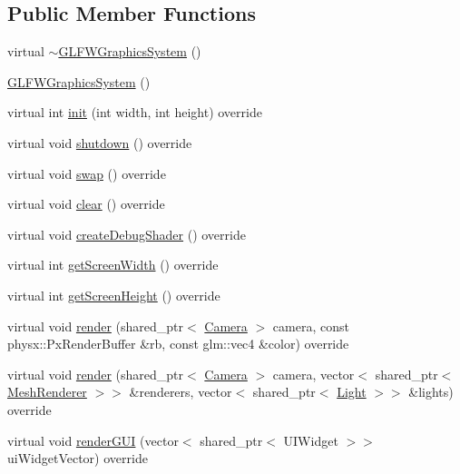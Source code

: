 \subsection*{Public Member Functions}
\begin{DoxyCompactItemize}
\item 
virtual \hyperlink{class_g_l_f_w_graphics_system_ad73c55b92fcbd41921d7929f7332e8af}{$\sim$\+G\+L\+F\+W\+Graphics\+System} ()
\item 
\hyperlink{class_g_l_f_w_graphics_system_a0cc238f56cef77f89e5b09b5a9b46cb6}{G\+L\+F\+W\+Graphics\+System} ()
\item 
virtual int \hyperlink{class_g_l_f_w_graphics_system_a4cba85b32cd751aab2f5a84c01199953}{init} (int width, int height) override
\item 
virtual void \hyperlink{class_g_l_f_w_graphics_system_ab12358c2a7034dcf75df074fbe4d86d4}{shutdown} () override
\item 
virtual void \hyperlink{class_g_l_f_w_graphics_system_a52ef8cd44b2b45828452626d9e0b54d6}{swap} () override
\item 
virtual void \hyperlink{class_g_l_f_w_graphics_system_a84767a0209a04f598b866048e04b2035}{clear} () override
\item 
virtual void \hyperlink{class_g_l_f_w_graphics_system_a446723c2cad999498d013f71ab8e570f}{create\+Debug\+Shader} () override
\item 
virtual int \hyperlink{class_g_l_f_w_graphics_system_a8c31a0ea165e6c9cbd0e0c656342a200}{get\+Screen\+Width} () override
\item 
virtual int \hyperlink{class_g_l_f_w_graphics_system_ab6b0c31d3d5fb238a19c645630b87543}{get\+Screen\+Height} () override
\item 
virtual void \hyperlink{class_g_l_f_w_graphics_system_a606c4e6e8e53084d3d23bc7bbcdfc228}{render} (shared\+\_\+ptr$<$ \hyperlink{class_camera}{Camera} $>$ camera, const physx\+::\+Px\+Render\+Buffer \&rb, const glm\+::vec4 \&color) override
\item 
virtual void \hyperlink{class_g_l_f_w_graphics_system_a2cde625e8606c2905d7728f2cadf7371}{render} (shared\+\_\+ptr$<$ \hyperlink{class_camera}{Camera} $>$ camera, vector$<$ shared\+\_\+ptr$<$ \hyperlink{class_mesh_renderer}{Mesh\+Renderer} $>$$>$ \&renderers, vector$<$ shared\+\_\+ptr$<$ \hyperlink{class_light}{Light} $>$$>$ \&lights) override
\item 
virtual void \hyperlink{class_g_l_f_w_graphics_system_a8ebfaa6c98ba4a92618835de8966e8b9}{render\+G\+U\+I} (vector$<$ shared\+\_\+ptr$<$ U\+I\+Widget $>$$>$ ui\+Widget\+Vector) override
$$
\end{DoxyCompactItemize}
